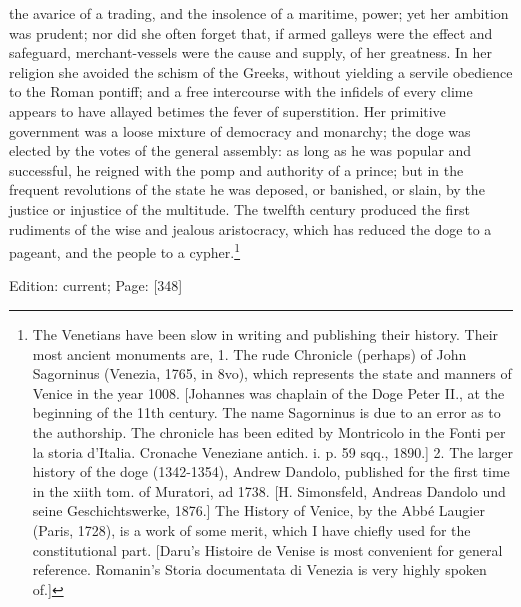 the avarice of a trading, and the insolence of a maritime, power; yet her ambition was prudent; nor did she often forget that, if armed galleys were the effect and safeguard, merchant-vessels were the cause and supply, of her greatness. In her religion she avoided the schism of the Greeks, without yielding a servile obedience to the Roman pontiff; and a free intercourse with the infidels of every clime appears to have allayed betimes the fever of superstition. Her primitive government was a loose mixture of democracy and monarchy; the doge was elected by the votes of the general assembly: as long as he was popular and successful, he reigned with the pomp and authority of a prince; but in the frequent revolutions of the state he was deposed, or banished, or slain, by the justice or injustice of the multitude. The twelfth century produced the first rudiments of the wise and jealous aristocracy, which has reduced the doge to a pageant, and the people to a cypher.\footnote{The Venetians have been slow in writing and publishing their history. Their most ancient monuments are, 1. The rude Chronicle (perhaps) of John Sagorninus (Venezia, 1765, in 8vo), which represents the state and manners of Venice in the year 1008. [Johannes was chaplain of the Doge Peter II., at the beginning of the 11th century. The name Sagorninus is due to an error as to the authorship. The chronicle has been edited by Montricolo in the Fonti per la storia d\texthebrew{}’Italia. Cronache Veneziane antich. i. p. 59 sqq., 1890.] 2. The larger history of the doge (1342-1354), Andrew Dandolo, published for the first time in the xiith tom. of Muratori, ad 1738. [H. Simonsfeld, Andreas Dandolo und seine Geschichtswerke, 1876.] The History of Venice, by the Abbé Laugier (Paris, 1728), is a work of some merit, which I have chiefly used for the constitutional part. [Daru\texthebrew{}’s Histoire de Venise is most convenient for general reference. Romanin\texthebrew{}’s Storia documentata di Venezia is very highly spoken of.]}

Edition: current; Page: [348]

